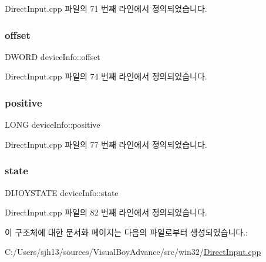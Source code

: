 Direct\+Input.\+cpp 파일의 71 번째 라인에서 정의되었습니다.

\mbox{\label{structdevice_info_a224f64e679eb41aa2c894856d693d57d}} 
\subsubsection{\texorpdfstring{offset}{offset}}
{\footnotesize\ttfamily D\+W\+O\+RD device\+Info\+::offset}



Direct\+Input.\+cpp 파일의 74 번째 라인에서 정의되었습니다.

\mbox{\label{structdevice_info_ae4cfa5b3fb76573fdf1e3936373ae47a}} 
\subsubsection{\texorpdfstring{positive}{positive}}
{\footnotesize\ttfamily L\+O\+NG device\+Info\+::positive}



Direct\+Input.\+cpp 파일의 77 번째 라인에서 정의되었습니다.

\mbox{\label{structdevice_info_a32e5855cac9794767be03c67be242c01}} 
\subsubsection{\texorpdfstring{state}{state}}
{\footnotesize\ttfamily D\+I\+J\+O\+Y\+S\+T\+A\+TE device\+Info\+::state}



Direct\+Input.\+cpp 파일의 82 번째 라인에서 정의되었습니다.



이 구조체에 대한 문서화 페이지는 다음의 파일로부터 생성되었습니다.\+:\begin{DoxyCompactItemize}
\item 
C\+:/\+Users/sjh13/sources/\+Visual\+Boy\+Advance/src/win32/\mbox{\hyperlink{_direct_input_8cpp}{Direct\+Input.\+cpp}}\end{DoxyCompactItemize}
